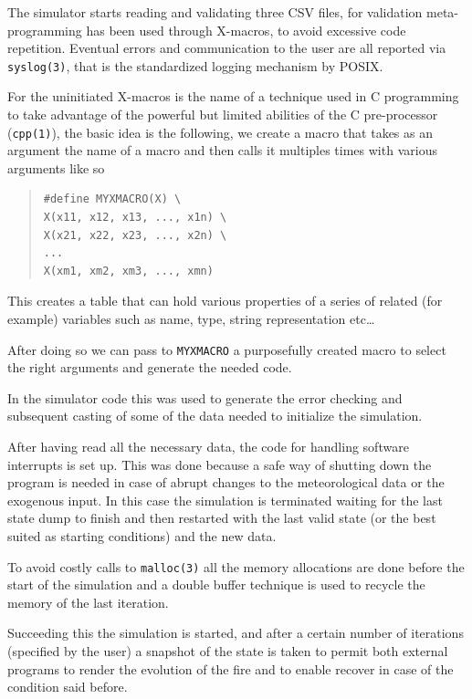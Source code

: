 \documentclass[Lau]{sapthesis} %
\begin{document}
The simulator starts reading and validating three CSV files, for validation
meta-programming has been used through X-macros, to avoid excessive code
repetition. Eventual errors and communication to the user are all reported via
\texttt{syslog(3)}, that is the standardized logging mechanism by POSIX.

For the uninitiated X-macros is the name of a technique used in C programming to
take advantage of the powerful but limited abilities of the C pre-processor
(\texttt{cpp(1)}), the basic idea is the following, we create a macro that takes
as an argument the name of a macro and then calls it multiples times with
various arguments like so

\begin{quote}
\begin{verbatim}
#define MYXMACRO(X) \
X(x11, x12, x13, ..., x1n) \
X(x21, x22, x23, ..., x2n) \
...
X(xm1, xm2, xm3, ..., xmn)
\end{verbatim}
\end{quote}

This creates a table that can hold various properties of a series of related
(for example) variables such as name, type, string representation etc\dots

After doing so we can pass to \texttt{MYXMACRO} a purposefully created macro to
select the right arguments and generate the needed code.

In the simulator code this was used to generate the error checking and
subsequent casting of some of the data needed to initialize the simulation.

After having read all the necessary data, the code for handling software
interrupts is set up. This was done because a safe way of shutting down the
program is needed in case of abrupt changes to the meteorological data or the
exogenous input. In this case the simulation is terminated waiting for the last
state dump to finish and then restarted with the last valid state (or the best
suited as starting conditions) and the new data.

To avoid costly calls to \texttt{malloc(3)} all the memory allocations are done
before the start of the simulation and a double buffer technique is used to
recycle the memory of the last iteration.

Succeeding this the simulation is started, and after a certain number of
iterations (specified by the user) a snapshot of the state is taken to permit
both external programs to render the evolution of the fire and to enable recover
in case of the condition said before.
\end{document}
